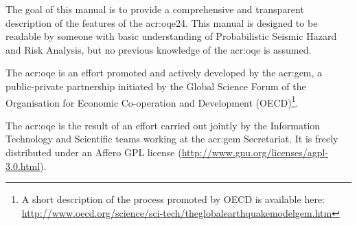The goal of this manual is to provide a comprehensive and transparent
description of the features of the \glsdesc{acr:oqe24}. This manual is
designed to be readable by someone with basic understanding of Probabilistic
Seismic Hazard and Risk Analysis, but no previous knowledge of the
\glsdesc{acr:oqe} is assumed.

The \glsdesc{acr:oqe} is an effort promoted and actively developed by the
\glsdesc{acr:gem}, a public-private partnership initiated by the
Global Science Forum of the Organisation for Economic Co-operation and Development
(OECD)\footnote{A short description of the process promoted by OECD is available here:\\\href{http://www.oecd.org/science/sci-tech/theglobalearthquakemodelgem.htm}{http://www.oecd.org/science/sci-tech/theglobalearthquakemodelgem.htm}}.

The \glsdesc{acr:oqe} is the result of an effort carried out jointly by the
Information Technology and Scientific teams working at the \gls{acr:gem} Secretariat.
It is freely distributed under an Affero GPL license
(\href{http://www.gnu.org/licenses/agpl-3.0.html}{http://www.gnu.org/licenses/agpl-3.0.html}).